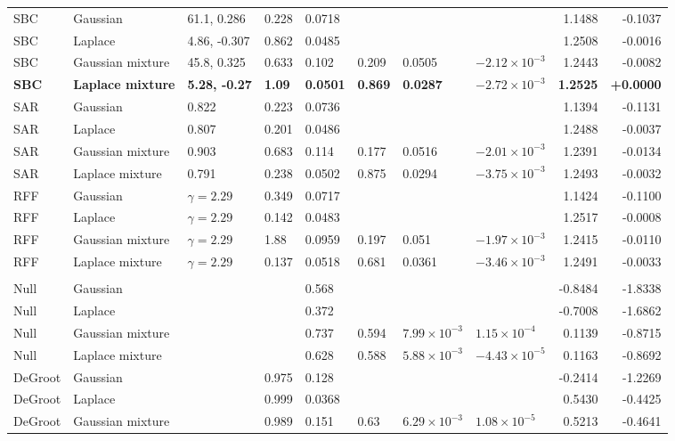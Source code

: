 \begin{longtable}{llllllllrr}
SBC & Gaussian & 61.1, 0.286 & 0.228 & 0.0718 &  &  &  & 1.1488 & -0.1037 \\
SBC & Laplace & 4.86, -0.307 & 0.862 & 0.0485 &  &  &  & 1.2508 & -0.0016 \\
SBC & Gaussian mixture & 45.8, 0.325 & 0.633 & 0.102 & 0.209 & 0.0505 & $-2.12\times10^{-3}$ & 1.2443 & -0.0082 \\
\textbf{SBC} & \textbf{Laplace mixture} & \textbf{5.28, -0.27} & \textbf{1.09} & \textbf{0.0501} & \textbf{0.869} & \textbf{0.0287} & \textbf{$-2.72\times10^{-3}$} & \textbf{1.2525} & \textbf{+0.0000} \\
SAR & Gaussian & 0.822 & 0.223 & 0.0736 &  &  &  & 1.1394 & -0.1131 \\
SAR & Laplace & 0.807 & 0.201 & 0.0486 &  &  &  & 1.2488 & -0.0037 \\
SAR & Gaussian mixture & 0.903 & 0.683 & 0.114 & 0.177 & 0.0516 & $-2.01\times10^{-3}$ & 1.2391 & -0.0134 \\
SAR & Laplace mixture & 0.791 & 0.238 & 0.0502 & 0.875 & 0.0294 & $-3.75\times10^{-3}$ & 1.2493 & -0.0032 \\
RFF & Gaussian & $\gamma=2.29$ & 0.349 & 0.0717 &  &  &  & 1.1424 & -0.1100 \\
RFF & Laplace & $\gamma=2.29$ & 0.142 & 0.0483 &  &  &  & 1.2517 & -0.0008 \\
RFF & Gaussian mixture & $\gamma=2.29$ & 1.88 & 0.0959 & 0.197 & 0.051 & $-1.97\times10^{-3}$ & 1.2415 & -0.0110 \\
RFF & Laplace mixture & $\gamma=2.29$ & 0.137 & 0.0518 & 0.681 & 0.0361 & $-3.46\times10^{-3}$ & 1.2491 & -0.0033 \\
\midrule
\multicolumn{10}{l}{\cmv{}} \\
Null & Gaussian &  &  & 0.568 &  &  &  & -0.8484 & -1.8338 \\
Null & Laplace &  &  & 0.372 &  &  &  & -0.7008 & -1.6862 \\
Null & Gaussian mixture &  &  & 0.737 & 0.594 & $7.99\times10^{-3}$ & $1.15\times10^{-4}$ & 0.1139 & -0.8715 \\
Null & Laplace mixture &  &  & 0.628 & 0.588 & $5.88\times10^{-3}$ & $-4.43\times10^{-5}$ & 0.1163 & -0.8692 \\
DeGroot & Gaussian &  & 0.975 & 0.128 &  &  &  & -0.2414 & -1.2269 \\
DeGroot & Laplace &  & 0.999 & 0.0368 &  &  &  & 0.5430 & -0.4425 \\
DeGroot & Gaussian mixture &  & 0.989 & 0.151 & 0.63 & $6.29\times10^{-3}$ & $1.08\times10^{-5}$ & 0.5213 & -0.4641 \\

\end{longtable}
